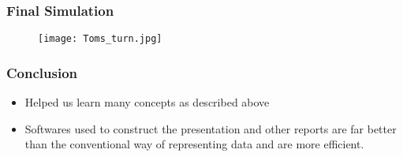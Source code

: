 \documentclass[]{beamer}%
\begin{document}
\begin{frame}
\frametitle{Final Simulation}
\center
\begin{figure}
	\texttt{[image: Toms\_turn.jpg]}
\end{figure}
\end{frame}

\begin{frame}
\frametitle{Conclusion}
    \begin{itemize}
        \item<1->Helped us learn many concepts as described above
        \item<2->Softwares used to construct the presentation and other reports are far better than the conventional way of representing data and are more efficient.
    \end{itemize}
\end{frame}
\end{document}

